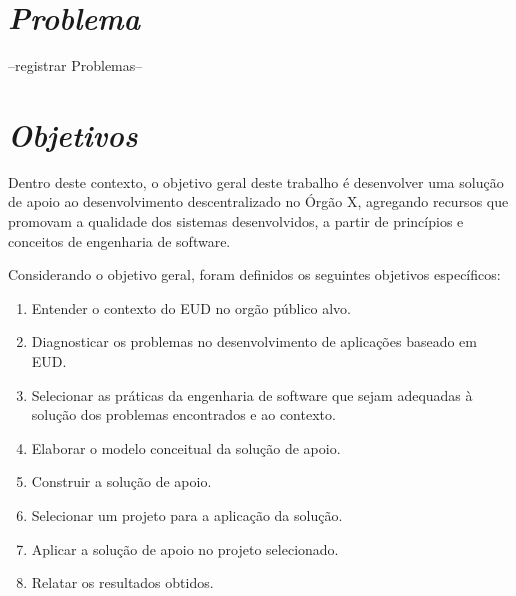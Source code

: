 \section{\textit{Problema}}

--registrar Problemas--

\section{\textit{Objetivos}}

Dentro deste contexto, o objetivo geral deste trabalho é desenvolver uma solução de apoio ao desenvolvimento descentralizado no Órgão X, agregando recursos que promovam a qualidade dos sistemas desenvolvidos, a partir de princípios e conceitos de engenharia de software.

Considerando o objetivo geral, foram definidos os seguintes objetivos específicos:

\begin{enumerate}
	\item Entender o contexto do EUD no orgão público alvo.
	\item Diagnosticar os problemas no desenvolvimento de aplicações baseado em EUD.
	\item Selecionar as práticas da engenharia de software que sejam adequadas à solução dos problemas encontrados e ao contexto.
	\item Elaborar o modelo conceitual da solução de apoio.
	\item Construir a solução de apoio.
	\item Selecionar um projeto para a aplicação da solução.
	\item Aplicar a solução de apoio no projeto selecionado.
	\item Relatar os resultados obtidos.
\end{enumerate}

